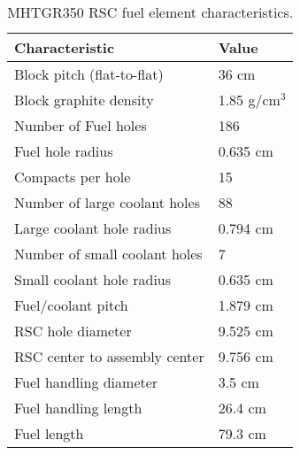 \documentclass[11pt,letterpaper]{article}
\begin{document}
	\begin{table}[htbp!]
		\centering
	    \caption{MHTGR350 RSC fuel element characteristics.}
	    \label{tab:rcharacteristics}
		\begin{tabular}{l|l}
		\hline
		Characteristic                   & Value         \\ \hline
		Block pitch (flat-to-flat)       & 36 cm         \\
		Block graphite density           & 1.85 g/cm$^3$ \\
		Number of Fuel holes             & 186           \\
		Fuel hole radius                 & 0.635 cm      \\
		Compacts per hole                & 15            \\
		Number of large coolant holes    & 88            \\
		Large coolant hole radius        & 0.794 cm      \\
		Number of small coolant holes    & 7             \\
		Small coolant hole radius        & 0.635 cm      \\
		Fuel/coolant pitch               & 1.879 cm      \\ 
		RSC hole diameter                & 9.525 cm      \\
		RSC center to assembly center    & 9.756 cm      \\
		Fuel handling diameter           & 3.5 cm        \\ 
		Fuel handling length             & 26.4 cm       \\
		Fuel length                      & 79.3 cm       \\ \hline
		\end{tabular}
	\end{table}

\pagebreak


\end{document}
